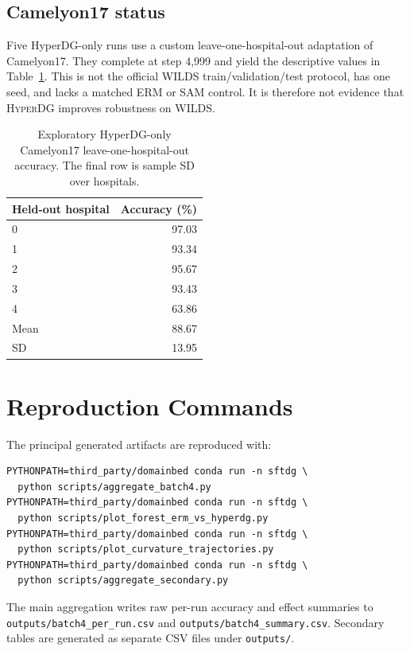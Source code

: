 \documentclass[10pt]{article}
\newcommand{\method}{\textsc{HyperDG}}
\begin{document}
\subsection{Camelyon17 status}

Five HyperDG-only runs use a custom leave-one-hospital-out adaptation of
Camelyon17. They complete at step 4,999 and yield the descriptive values in
Table~\ref{tab:camelyon}. This is not the official WILDS train/validation/test
protocol, has one seed, and lacks a matched ERM or SAM control. It is therefore
not evidence that \method{} improves robustness on WILDS.

\begin{table}[H]
\centering
\caption{Exploratory HyperDG-only Camelyon17 leave-one-hospital-out accuracy.
The final row is sample SD over hospitals.}
\label{tab:camelyon}
\begin{tabular}{lr}
\toprule
Held-out hospital & Accuracy (\%) \\
\midrule
0 & 97.03 \\
1 & 93.34 \\
2 & 95.67 \\
3 & 93.43 \\
4 & 63.86 \\
\midrule
Mean & 88.67 \\
SD & 13.95 \\
\bottomrule
\end{tabular}
\end{table}

\section{Reproduction Commands}
\label{sec:repro}

The principal generated artifacts are reproduced with:
\begin{verbatim}
PYTHONPATH=third_party/domainbed conda run -n sftdg \
  python scripts/aggregate_batch4.py
PYTHONPATH=third_party/domainbed conda run -n sftdg \
  python scripts/plot_forest_erm_vs_hyperdg.py
PYTHONPATH=third_party/domainbed conda run -n sftdg \
  python scripts/plot_curvature_trajectories.py
PYTHONPATH=third_party/domainbed conda run -n sftdg \
  python scripts/aggregate_secondary.py
\end{verbatim}
The main aggregation writes raw per-run accuracy and effect summaries to
\texttt{outputs/batch4\_per\_run.csv} and
\texttt{outputs/batch4\_summary.csv}. Secondary tables are generated as
separate CSV files under \texttt{outputs/}.
\end{document}
